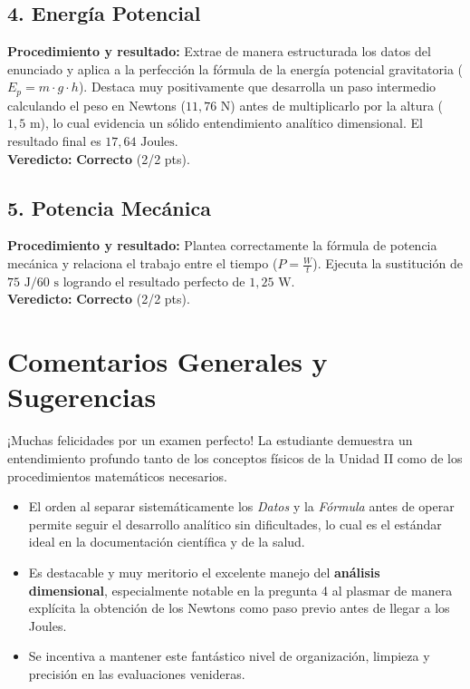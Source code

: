 \documentclass[12pt,letterpaper]{article}
\begin{document}
\subsection*{4. Energía Potencial}
\textbf{Procedimiento y resultado:} Extrae de manera estructurada los datos del enunciado y aplica a la perfección la fórmula de la energía potencial gravitatoria ($E_p = m \cdot g \cdot h$). Destaca muy positivamente que desarrolla un paso intermedio calculando el peso en Newtons ($11,76 \text{ N}$) antes de multiplicarlo por la altura ($1,5 \text{ m}$), lo cual evidencia un sólido entendimiento analítico dimensional. El resultado final es $17,64 \text{ Joules}$. \\
\textbf{Veredicto:} \textbf{Correcto} (2/2 pts).

\subsection*{5. Potencia Mecánica}
\textbf{Procedimiento y resultado:} Plantea correctamente la fórmula de potencia mecánica y relaciona el trabajo entre el tiempo ($P = \frac{W}{t}$). Ejecuta la sustitución de $75 \text{ J} / 60 \text{ s}$ logrando el resultado perfecto de $1,25 \text{ W}$. \\
\textbf{Veredicto:} \textbf{Correcto} (2/2 pts).

\vspace{0.5cm}
\section*{Comentarios Generales y Sugerencias}
¡Muchas felicidades por un examen perfecto! La estudiante demuestra un entendimiento profundo tanto de los conceptos físicos de la Unidad II como de los procedimientos matemáticos necesarios.
\begin{itemize}
    \item El orden al separar sistemáticamente los \textit{Datos} y la \textit{Fórmula} antes de operar permite seguir el desarrollo analítico sin dificultades, lo cual es el estándar ideal en la documentación científica y de la salud.
    \item Es destacable y muy meritorio el excelente manejo del \textbf{análisis dimensional}, especialmente notable en la pregunta 4 al plasmar de manera explícita la obtención de los Newtons como paso previo antes de llegar a los Joules.
    \item Se incentiva a mantener este fantástico nivel de organización, limpieza y precisión en las evaluaciones venideras.
\end{itemize}
\end{document}
